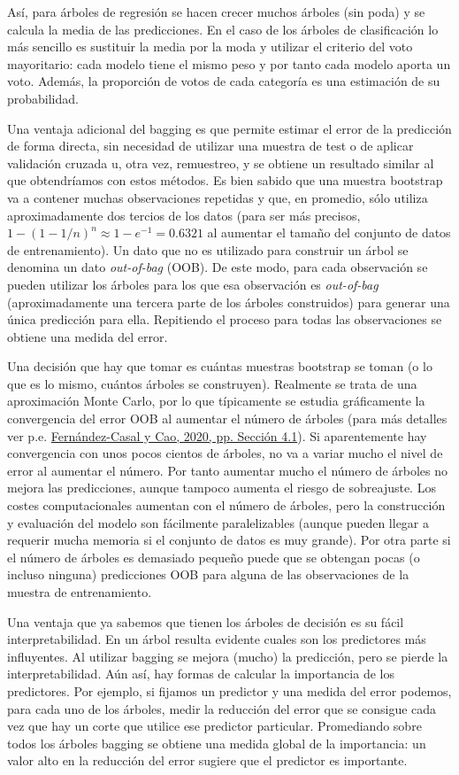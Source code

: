 \documentclass[
  spanish,
]{book}
\theoremstyle{break}
\theoremstyle{definition}
\theoremstyle{definition}
\theoremstyle{definition}
\theoremstyle{definition}
\theoremstyle{remark}
\begin{document}
Así, para árboles de regresión se hacen crecer muchos árboles (sin poda) y se calcula la media de las predicciones.
En el caso de los árboles de clasificación lo más sencillo es sustituir la media por la moda y utilizar el criterio del voto mayoritario: cada modelo tiene el mismo peso y por tanto cada modelo aporta un voto.
Además, la proporción de votos de cada categoría es una estimación de su probabilidad.

Una ventaja adicional del bagging es que permite estimar el error de la predicción de forma directa, sin necesidad de utilizar una muestra de test o de aplicar validación cruzada u, otra vez, remuestreo, y se obtiene un resultado similar al que obtendríamos con estos métodos.
Es bien sabido que una muestra bootstrap va a contener muchas observaciones repetidas y que, en promedio, sólo utiliza aproximadamente dos tercios de los datos (para ser más precisos, \(1 - (1 - 1/n)^n \approx 1 - e^{-1} = 0.6321\) al aumentar el tamaño del conjunto de datos de entrenamiento).
Un dato que no es utilizado para construir un árbol se denomina un dato \emph{out-of-bag} (OOB).
De este modo, para cada observación se pueden utilizar los árboles para los que esa observación es \emph{out-of-bag} (aproximadamente una tercera parte de los árboles construidos) para generar una única predicción para ella.
Repitiendo el proceso para todas las observaciones se obtiene una medida del error.

Una decisión que hay que tomar es cuántas muestras bootstrap se toman (o lo que es lo mismo, cuántos árboles se construyen).
Realmente se trata de una aproximación Monte Carlo, por lo que típicamente se estudia gráficamente la convergencia del error OOB al aumentar el número de árboles (para más detalles ver p.e. \protect\hyperlink{ref-fernandez2020simbook}{Fernández-Casal y Cao, 2020, pp. Sección 4.1}).
Si aparentemente hay convergencia con unos pocos cientos de árboles, no va a variar mucho el nivel de error al aumentar el número.
Por tanto aumentar mucho el número de árboles no mejora las predicciones, aunque tampoco aumenta el riesgo de sobreajuste.
Los costes computacionales aumentan con el número de árboles, pero la construcción y evaluación del modelo son fácilmente paralelizables (aunque pueden llegar a requerir mucha memoria si el conjunto de datos es muy grande).
Por otra parte si el número de árboles es demasiado pequeño puede que se obtengan pocas (o incluso ninguna) predicciones OOB para alguna de las observaciones de la muestra de entrenamiento.

Una ventaja que ya sabemos que tienen los árboles de decisión es su fácil interpretabilidad.
En un árbol resulta evidente cuales son los predictores más influyentes.
Al utilizar bagging se mejora (mucho) la predicción, pero se pierde la interpretabilidad.
Aún así, hay formas de calcular la importancia de los predictores.
Por ejemplo, si fijamos un predictor y una medida del error podemos, para cada uno de los árboles, medir la reducción del error que se consigue cada vez que hay un corte que utilice ese predictor particular.
Promediando sobre todos los árboles bagging se obtiene una medida global de la importancia: un valor alto en la reducción del error sugiere que el predictor es importante.
\end{document}
